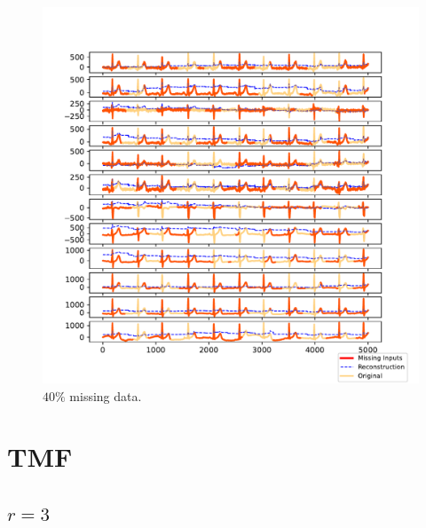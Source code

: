 \documentclass{mldsmsc}
\begin{document}
\begin{figure}[H]
\vspace{1em} %

\begin{minipage}{0.4\linewidth}
    \centering
    \includegraphics[width=\linewidth]{images/missing/mlesmf_output_40_10.pdf}
    \caption{$40\%$ missing data.}
\end{minipage}
\end{figure}

\section{TMF}\label{app:tmf}

\subsection{$r = 3$}
\end{document}
